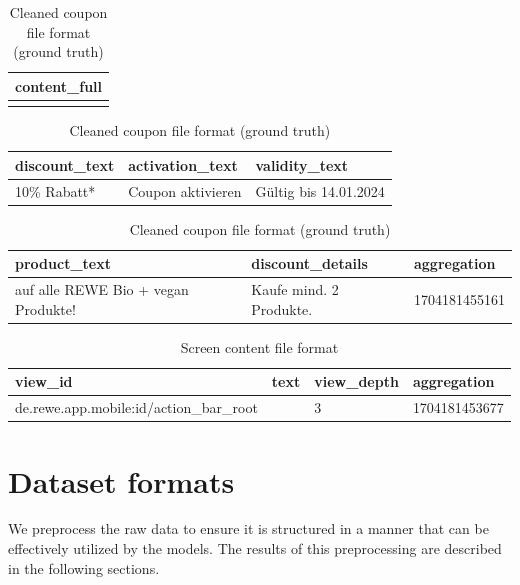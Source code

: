 \documentclass[licencjacka,en]{pracamgr}
\begin{document}
\begin{table}[ht]
\centering

\begin{tabular}{|p{}|}
\hline
\textbf{content\_full} \\
\hline
[Treuepunkte, 10\% Rabatt*, auf alle REWE Bio + vegan Produkte!,
Kaufe mind. 2 Produkte., Gültig bis 14.01.2024, Coupon aktivieren] \\
\hline
\end{tabular}

\vspace{1em}

\begin{tabular}{|l|l|l|}
\hline
\textbf{discount\_text} & \textbf{activation\_text} & \textbf{validity\_text} \\
\hline
10\% Rabatt* & Coupon aktivieren & Gültig bis 14.01.2024 \\
\hline
\end{tabular}

\vspace{1em}

\begin{tabular}{|l|l|l|}
\hline
\textbf{product\_text} & \textbf{discount\_details} & \textbf{aggregation} \\
\hline
auf alle REWE Bio + vegan Produkte! & Kaufe mind. 2 Produkte. & 1704181455161 \\
\hline
\end{tabular}

\caption{Cleaned coupon file format (ground truth)}
\label{tab:coupons_rev_2}
\end{table}

\begin{table}[ht]
\centering
\begin{tabular}{|l|l|l|l|}
\hline
\textbf{view\_id} & \textbf{text} & \textbf{view\_depth} & \textbf{aggregation} \\
\hline
de.rewe.app.mobile:id/action\_bar\_root &  & 3 & 1704181453677 \\
\hline
\end{tabular}
\caption{Screen content file format}
\label{tab:coupons_rev_2_content}
\end{table}

\section{Dataset formats}
We preprocess the raw data to ensure it is structured in a manner that can be effectively utilized by the models. The results of this preprocessing are described in the following sections.
\end{document}
